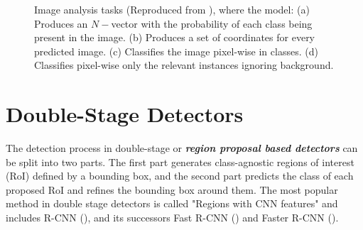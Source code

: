 \begin{figure}[!htb]
  \centering
  
  \caption{Image analysis tasks (Reproduced from \cite{garcia1704review}), where the model: (a) Produces an $N-$vector with the probability of each class being present in the image. (b) Produces a set of coordinates for every predicted image. (c) Classifies the image pixel-wise in classes. (d) Classifies pixel-wise only the relevant instances ignoring background.}
  \label{ch2:fig1}
\end{figure}

\section{Double-Stage Detectors}

The detection process in double-stage or \textbf{\textit{region proposal based detectors}} can be split into two parts. The first part generates class-agnostic regions of interest (RoI) defined by a bounding box, and the second part predicts the class of each proposed RoI and refines the bounding box around them. The most popular method in double stage detectors is called "Regions with CNN features" and includes R-CNN (\cite{girshick2014rich}), and its successors Fast R-CNN (\cite{girshick2015fast}) and Faster R-CNN (\cite{ren2015faster}).

